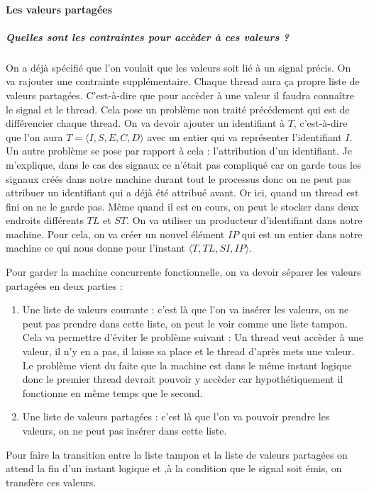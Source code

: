 \documentclass[10pt,a4paper]{article}
\begin{document}
				\paragraph{Les valeurs partagées}
				
					\subparagraph{Quelles sont les contraintes pour accèder à ces valeurs ?}
					On a déjà spécifié que l'on voulait que les valeurs soit lié à un signal précis. On va rajouter une contrainte supplémentaire. Chaque thread aura ça propre liste de valeurs partagées. C'est-à-dire que pour accèder à une valeur il faudra connaître le signal et le thread. Cela pose un problème non traité précédement qui est de différencier chaque thread. On va devoir ajouter un identifiant à $T$, c'est-à-dire que l'on aura $T = \langle I,S,E,C,D\rangle$ avec un entier qui va représenter l'identifiant $I$. Un autre problème se pose par rapport à cela : l'attribution d'un identifiant.
					\smallbreak
					Je m'explique, dans le cas des signaux ce n'était pas compliqué car on garde tous les signaux créés dans notre machine durant tout le processus donc on ne peut pas attribuer un identifiant qui a déjà été attribué avant. Or ici, quand un thread est fini on ne le garde pas. Même quand il est en cours, on peut le stocker dans deux endroits différents $TL$ et $ST$. On va utiliser un producteur d'identifiant dans notre machine. Pour cela, on va créer un nouvel élément $IP$ qui est un entier dans notre machine ce qui nous donne pour l'instant $\langle T,TL,SI,IP\rangle$.
					\medbreak
					
					Pour garder la machine concurrente fonctionnelle, on va devoir séparer les valeurs partagées en deux parties :
					\begin{enumerate}
						\item Une liste de valeurs courante : c'est là que l'on va insérer les valeurs, on ne peut pas prendre dans cette liste, on peut le voir comme une liste tampon. Cela va permettre d'éviter le problème suivant : 
						\smallbreak
						Un thread veut accèder à une valeur, il n'y en a pas, il laisse sa place et le thread d'après mets une valeur. Le problème vient du faite que la machine est dans le même instant logique donc le premier thread devrait pouvoir y accèder car hypothétiquement il fonctionne en même temps que le second.
						\item Une liste de valeurs partagées : c'est là que l'on va pouvoir prendre les valeurs, on ne peut pas insérer dans cette liste.
					\end{enumerate}
					\smallbreak
					Pour faire la transition entre la liste tampon et la liste de valeurs partagées on attend la fin d'un instant logique et ,à la condition que le signal soit émis, on transfère ces valeurs.
					\medbreak
					
\end{document}
